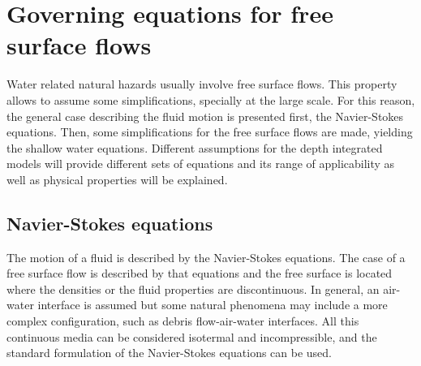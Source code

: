 
\chapter{Governing equations for free surface flows}
\label{equations}








Water related natural hazards usually involve free surface flows.
This property allows to assume some simplifications, specially at the large scale.
For this reason, the general case describing the fluid motion is presented first, the Navier-Stokes equations.
Then, some simplifications for the free surface flows are made, yielding the shallow water equations. Different assumptions for the depth integrated models will provide different sets of equations and its range of applicability as well as physical properties will be explained.




\section{Navier-Stokes equations}
\label{equations_ns}


The motion of a fluid is described by the Navier-Stokes equations. The case of a free surface flow is described by that equations and the free surface is located where the densities or the fluid properties are discontinuous. In general, an air-water interface is assumed but some natural phenomena may include a more complex configuration, such as debris flow-air-water interfaces. All this continuous media can be considered isotermal and incompressible, and the standard formulation of the Navier-Stokes equations can be used.

